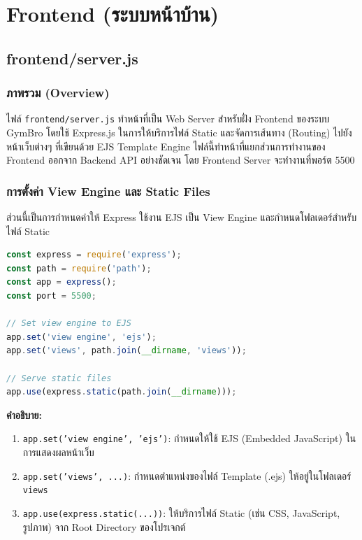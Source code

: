 \section{Frontend (ระบบหน้าบ้าน)}

\subsection{frontend/server.js}

\subsubsection{ภาพรวม (Overview)}
ไฟล์ \texttt{frontend/server.js} ทำหน้าที่เป็น Web Server สำหรับฝั่ง Frontend ของระบบ GymBro โดยใช้ Express.js ในการให้บริการไฟล์ Static และจัดการเส้นทาง (Routing) ไปยังหน้าเว็บต่างๆ ที่เขียนด้วย EJS Template Engine ไฟล์นี้ทำหน้าที่แยกส่วนการทำงานของ Frontend ออกจาก Backend API อย่างชัดเจน โดย Frontend Server จะทำงานที่พอร์ต 5500

\subsubsection{การตั้งค่า View Engine และ Static Files}
ส่วนนี้เป็นการกำหนดค่าให้ Express ใช้งาน EJS เป็น View Engine และกำหนดโฟลเดอร์สำหรับไฟล์ Static

\begin{lstlisting}[language=JavaScript, caption={การตั้งค่า View Engine และ Static Files ใน frontend/server.js}, label={code:frontend-server-setup}]
const express = require('express');
const path = require('path');
const app = express();
const port = 5500;

// Set view engine to EJS
app.set('view engine', 'ejs');
app.set('views', path.join(__dirname, 'views'));

// Serve static files
app.use(express.static(path.join(__dirname)));
\end{lstlisting}

\textbf{คำอธิบาย:}
\begin{enumerate}
    \item \texttt{app.set('view engine', 'ejs')}: กำหนดให้ใช้ EJS (Embedded JavaScript) ในการแสดงผลหน้าเว็บ
    \item \texttt{app.set('views', ...)}: กำหนดตำแหน่งของไฟล์ Template (.ejs) ให้อยู่ในโฟลเดอร์ \texttt{views}
    \item \texttt{app.use(express.static(...))}: ให้บริการไฟล์ Static (เช่น CSS, JavaScript, รูปภาพ) จาก Root Directory ของโปรเจกต์
\end{enumerate}

